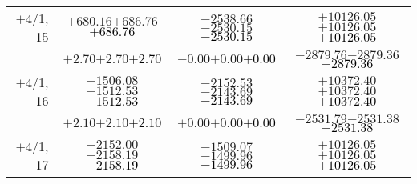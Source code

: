 \documentclass[compress]{beamer}
\begin{document}
\begin{frame}
{\begin{tabular}{r | c | c | c}
$+$4/1, 15 & $+680.16$\hspace{0.1 cm}$+686.76$\hspace{0.1 cm}\textcolor{black}{$+686.76$} & $-2538.66$\hspace{0.1 cm}$-2530.15$\hspace{0.1 cm}\textcolor{black}{$-2530.15$} & $+10126.05$\hspace{0.1 cm}$+10126.05$\hspace{0.1 cm}\textcolor{black}{$+10126.05$} \\
           & $+2.70$\hspace{0.1 cm}$+2.70$\hspace{0.1 cm}\textcolor{black}{$+2.70$} & $-0.00$\hspace{0.1 cm}$+0.00$\hspace{0.1 cm}\textcolor{black}{$+0.00$} & $-2879.76$\hspace{0.1 cm}$-2879.36$\hspace{0.1 cm}\textcolor{black}{$-2879.36$} \\
$+$4/1, 16 & $+1506.08$\hspace{0.1 cm}$+1512.53$\hspace{0.1 cm}\textcolor{black}{$+1512.53$} & $-2152.53$\hspace{0.1 cm}$-2143.69$\hspace{0.1 cm}\textcolor{black}{$-2143.69$} & $+10372.40$\hspace{0.1 cm}$+10372.40$\hspace{0.1 cm}\textcolor{black}{$+10372.40$} \\
           & $+2.10$\hspace{0.1 cm}$+2.10$\hspace{0.1 cm}\textcolor{black}{$+2.10$} & $+0.00$\hspace{0.1 cm}$+0.00$\hspace{0.1 cm}\textcolor{black}{$+0.00$} & $-2531.79$\hspace{0.1 cm}$-2531.38$\hspace{0.1 cm}\textcolor{black}{$-2531.38$} \\
$+$4/1, 17 & $+2152.00$\hspace{0.1 cm}$+2158.19$\hspace{0.1 cm}\textcolor{black}{$+2158.19$} & $-1509.07$\hspace{0.1 cm}$-1499.96$\hspace{0.1 cm}\textcolor{black}{$-1499.96$} & $+10126.05$\hspace{0.1 cm}$+10126.05$\hspace{0.1 cm}\textcolor{black}{$+10126.05$} \\

\end{tabular}}
\end{frame}
\end{document}
